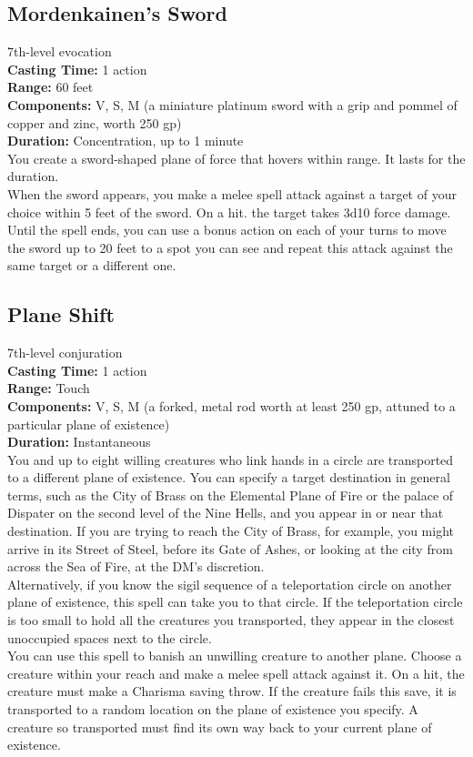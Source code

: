 \documentclass[11pt, A4paper, english]{article}
\begin{document}
		\subsection{Mordenkainen's Sword}
7th-level evocation \\
\textbf{Casting Time:} 1 action \\
\textbf{Range:} 60 feet \\
\textbf{Components:} V, S, M (a miniature platinum sword with a grip and pommel of copper and zinc, worth 250 gp) \\
\textbf{Duration:} Concentration, up to 1 minute \\
You create a sword-shaped plane of force that hovers within range. It lasts for the duration. \\
When the sword appears, you make a melee spell attack against a target of your choice within 5 feet of the sword. On a hit. the target takes 3d10 force damage. Until the spell ends, you can use a bonus action on each of your turns to move the sword up to 20 feet to a spot you can see and repeat this attack against the same target or a different one.

		\subsection{Plane Shift}
7th-level conjuration \\
\textbf{Casting Time:} 1 action \\
\textbf{Range:} Touch \\
\textbf{Components:} V, S, M (a forked, metal rod worth at least 250 gp, attuned to a particular plane of existence) \\
\textbf{Duration:} Instantaneous \\
You and up to eight willing creatures who link hands in a circle are transported to a different plane of existence. You can specify a target destination in general terms, such as the City of Brass on the Elemental Plane of Fire or the palace of Dispater on the second level of the Nine Hells, and you appear in or near that destination. If you are trying to reach the City of Brass, for example, you might arrive in its Street of Steel, before its Gate of Ashes, or looking at the city from across the Sea of Fire, at the DM’s discretion. \\
Alternatively, if you know the sigil sequence of a teleportation circle on another plane of existence, this spell can take you to that circle. If the teleportation circle is too small to hold all the creatures you transported, they appear in the closest unoccupied spaces next to the circle. \\
You can use this spell to banish an unwilling creature to another plane. Choose a creature within your reach and make a melee spell attack against it. On a hit, the creature must make a Charisma saving throw. If the creature fails this save, it is transported to a random location on the plane of existence you specify. A creature so transported must find its own way back to your current plane of existence.
\end{document}
